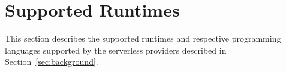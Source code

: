 
\section{Supported Runtimes}\label{sec:runtime}
This section describes the supported runtimes and respective programming languages supported by the serverless providers described in Section~\ref{sec:background}. 
